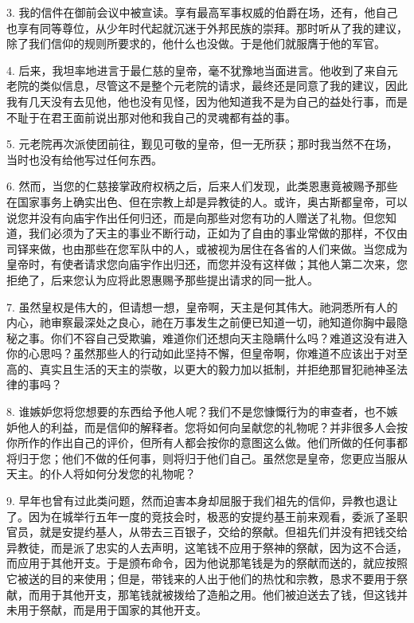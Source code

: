 3. 我的信件在御前会议中被宣读。享有最高军事权威的伯爵在场，还有，他自己也享有同等尊位，从少年时代起就沉迷于外邦民族的崇拜。那时听从了我的建议，除了我们信仰的规则所要求的，他什么也没做。于是他们就服膺于他的军官。\par

4. 后来，我坦率地进言于最仁慈的皇帝，毫不犹豫地当面进言。他收到了来自元老院的类似信息，尽管这不是整个元老院的请求，最终还是同意了我的建议，因此我有几天没有去见他，他也没有见怪，因为他知道我不是为自己的益处行事，而是不耻于在君王面前说出那对他和我自己的灵魂都有益的事。\par

5. 元老院再次派使团前往，觐见可敬的皇帝，但一无所获；那时我当然不在场，当时也没有给他写过任何东西。\par

6. 然而，当您的仁慈接掌政府权柄之后，后来人们发现，此类恩惠竟被赐予那些在国家事务上确实出色、但在宗教上却是异教徒的人。或许，奥古斯都皇帝，可以说您并没有向庙宇作出任何归还，而是向那些对您有功的人赠送了礼物。但您知道，我们必须为了天主的事业不断行动，正如为了自由的事业常做的那样，不仅由司铎来做，也由那些在您军队中的人，或被视为居住在各省的人们来做。当您成为皇帝时，有使者请求您向庙宇作出归还，而您并没有这样做；其他人第二次来，您拒绝了，后来您认为应将此恩惠赐予那些提出请求的同一批人。\par

7. 虽然皇权是伟大的，但请想一想，皇帝啊，天主是何其伟大。祂洞悉所有人的内心，祂审察最深处之良心，祂在万事发生之前便已知道一切，祂知道你胸中最隐秘之事。你们不容自己受欺骗，难道你们还想向天主隐瞒什么吗？难道这没有进入你的心思吗？虽然那些人的行动如此坚持不懈，但皇帝啊，你难道不应该出于对至高的、真实且生活的天主的崇敬，以更大的毅力加以抵制，并拒绝那冒犯祂神圣法律的事吗？\par

8. 谁嫉妒您将您想要的东西给予他人呢？我们不是您慷慨行为的审查者，也不嫉妒他人的利益，而是信仰的解释者。您将如何向呈献您的礼物呢？并非很多人会按你所作的作出自己的评价，但所有人都会按你的意图这么做。他们所做的任何事都将归于您；他们不做的任何事，则将归于他们自己。虽然您是皇帝，您更应当服从天主。的仆人将如何分发您的礼物呢？\par

9. 早年也曾有过此类问题，然而迫害本身却屈服于我们祖先的信仰，异教也退让了。因为在城举行五年一度的竞技会时，极恶的安提约基王前来观看，委派了圣职官员，就是安提约基人，从带去三百银子，交给的祭献。但祖先们并没有把钱交给异教徒，而是派了忠实的人去声明，这笔钱不应用于祭神的祭献，因为这不合适，而应用于其他开支。于是颁布命令，因为他说那笔钱是为的祭献而送的，就应按照它被送的目的来使用；但是，带钱来的人出于他们的热忱和宗教，恳求不要用于祭献，而用于其他开支，那笔钱就被拨给了造船之用。他们被迫送去了钱，但这钱并未用于祭献，而是用于国家的其他开支。\par

